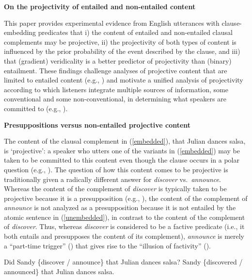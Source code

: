\documentclass[12pt,fleqn]{article}
\newcommand{\6}{\mbox{$[\hspace*{-.6mm}[$}}
\newcommand{\9}{\mbox{$]\hspace*{-.6mm}]$}}
\begin{document}
 
 
\begin{center}
{\large \bf On the projectivity of entailed and non-entailed content}
\end{center}

This paper provides experimental evidence from English utterances with clause-embedding predicates that i) the content of entailed and non-entailed clausal complements may be projective, ii) the projectivity of both types of content is influenced by the prior probability of the event described by the clause, and iii) that (gradient) veridicality is a better predictor of projectivity than (binary) entailment. These findings challenge analyses of projective content that are limited to entailed content (e.g., \citealt{heim83,vds92}) and motivate a unified analysis of projectivity according to which listeners integrate multiple sources of information, some conventional and some non-conventional, in determining what speakers are committed to (e.g., \citealt{brst-salt10,brst-ar,abrusan2011,abrusan2013,tbd-variability}). 

{\bf Presuppositions versus non-entailed projective content} 

The content of the clausal complement in (\ref{embedded}), that Julian dances salsa, is `projective': a speaker who utters one of the variants in (\ref{embedded}) may be taken to be committed to this content even though the clause occurs in a polar question (e.g., \citealt{ccmg90,brst-salt10}). The question of how this content comes to be projective is traditionally given a radically different answer for {\em discover} vs.\ {\em announce}. Whereas the content of the complement of {\em discover} is typically taken to be projective because it is a presupposition (e.g., \citealt{heim83,vds92}), the content of the complement of {\em announce} is not analyzed as a presupposition because it is not entailed by the atomic sentence in (\ref{unembedded}), in contrast to the content of the complement of {\em discover}. Thus, whereas {\em discover} is considered to be a factive predicate (i.e., it both entails and presupposes the content of its complement), {\em announce} is merely a ``part-time trigger'' (\citealt[139]{schlenker10}) that gives rise to the ``illusion of factivity'' (\citealt[76]{anand-hacquard2014}).

\vspace*{-.2cm}
\begin{exe}
\ex
\begin{xlist}
\ex\label{embedded} Did Sandy \{discover / announce\} that Julian dances salsa?
\ex\label{unembedded} Sandy \{discovered / announced\} that Julian dances salsa.
\end{xlist}
\end{exe}
\vspace*{-.2cm}
\end{document}

